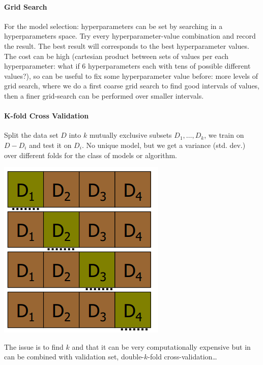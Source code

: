 \documentclass[10pt]{report}
\begin{document}
\paragraph{Grid Search} For the model selection: hyperparameters can be set by searching in a hyperparameters space. Try every hyperparameter-value combination and record the result. The best result will corresponds to the best hyperparameter values.\\
The cost can be high (cartesian product between sets of values per each hyperparameter: what if 6 hyperparameters each with tens of possible different values?), so can be useful to fix some hyperparameter value before: more levels of grid search, where we do a first coarse grid search to find good intervals of values, then a finer grid-search can be performed over smaller intervals.
\paragraph{K-fold Cross Validation} Split the data set $D$ into $k$ mutually exclusive subsets $D_1,\ldots, D_k$, we train on $D - D_i$ and test it on $D_i$. No unique model, but we get a variance (std. dev.) over different folds for the class of models or algorithm.
\begin{center}
	\includegraphics[scale=0.5]{3.png}
\end{center}
The issue is to find $k$ and that it can be very computationally expensive but in can be combined with validation set,  double-$k$-fold cross-validation\ldots
\end{document}
